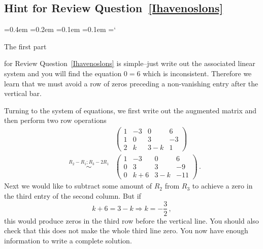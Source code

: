 
\subsection*{Hint for Review Question~\ref*{Ihavenoslons}}

{\ttfamily
{}\font=0.4em
\font=0.2em
\font=0.1em
\font=0.1em
\hyphenchar\font=`\-





\hypertarget{video_elementary_row_operations_hint}{The first part} for Review Question~\ref{Ihavenoslons} is simple--just 
write out the associated linear system and you will find the equation $0=6$ which is inconsistent. Therefore we learn 
that we must avoid a row of zeros preceding a non-vanishing entry after the vertical bar.

Turning to the system of equations, we first write out the augmented matrix and then perform two row operations
\begin{eqnarray*}
&&\left(\begin{array}{ccc|c}1&-3&0&6\\1&0&3&-3\\2&k&3-k&1\end{array}\right)\\[2mm]
&\stackrel{R_2-R_1;R_3-2R_1}\sim&
\left(\begin{array}{ccc|c}1&-3&0&6\\0&3&3&-9\\0&k+6&3-k&-11\end{array}\right)\, .
\end{eqnarray*}
Next we would like to subtract some amount of $R_2$ from $R_3$ to achieve a zero in the third entry of the second column. But if 
$$k+6=3-k\Rightarrow k=-\frac32\, ,$$
this would produce zeros in the third row before the vertical line.
You should also check that this does not make the whole third line zero. You now have enough information to write a complete solution.


}

